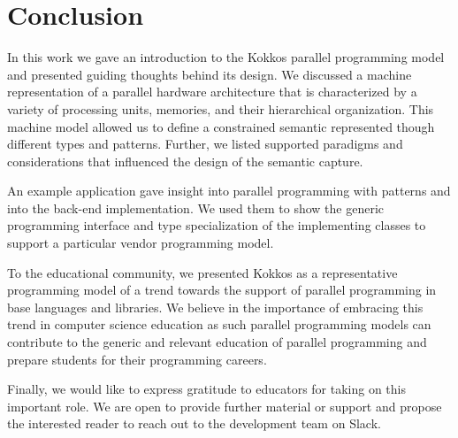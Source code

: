 \section{Conclusion}\label{chap:conclusion}
In this work we gave an introduction to the Kokkos parallel programming model and presented guiding thoughts behind its design. We discussed a machine representation of a parallel hardware architecture that is characterized by a variety of processing units, memories, and their hierarchical organization. This machine model allowed us to define a constrained semantic represented though different types and patterns. Further, we listed supported paradigms and considerations that influenced the design of the semantic capture.

An example application gave insight into parallel programming with patterns and into the back-end implementation. We used them to show the generic programming interface and type specialization of the implementing classes to support a particular vendor programming model.

To the educational community, we presented Kokkos as a representative programming model of a trend towards the support of parallel programming in base languages and libraries. We believe in the importance of embracing this trend in computer science education as such parallel programming models can contribute to the generic and relevant education of parallel programming and prepare students for their programming careers.

Finally, we would like to express gratitude to educators for taking on this important role. We are open to provide further material or support and propose the interested reader to reach out to the development team on Slack\cite{KOKKOS_SLACK}.

